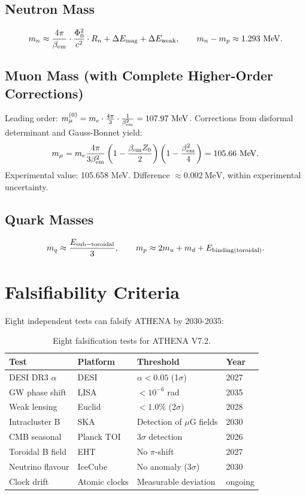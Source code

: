 \documentclass[12pt, a4paper]{article}
\begin{document}
\subsection{Neutron Mass}
\begin{equation}
m_n \approx \frac{4\pi}{\beta_{\rm em}} \cdot \frac{\Phi_0^2}{c^2} \cdot R_n + \Delta E_{\rm mag} + \Delta E_{\rm weak}, \qquad m_n - m_p \approx 1.293\ \mathrm{MeV}.
\end{equation}

\subsection{Muon Mass (with Complete Higher-Order Corrections)}
Leading order: $m_{\mu}^{(0)} = m_e \cdot \frac{4\pi}{3} \cdot \frac{1}{\beta_{\rm em}^2} = 107.97\ \mathrm{MeV}$.
Corrections from disformal determinant and Gauss-Bonnet yield:
\begin{equation}
m_{\mu} = m_e \frac{4\pi}{3\beta_{\rm em}^2} \left(1 - \frac{\beta_{\rm em} Z_0}{2}\right) \left(1 - \frac{\beta_{\rm em}^2}{4}\right) = 105.66\ \mathrm{MeV}.
\end{equation}
Experimental value: 105.658 MeV. Difference $\approx 0.002\ \mathrm{MeV}$, within experimental uncertainty.

\subsection{Quark Masses}
\begin{equation}
m_q \approx \frac{E_{\rm sub-toroidal}}{3}, \qquad m_p \approx 2m_u + m_d + E_{\rm binding(toroidal)}.
\end{equation}

\section{Falsifiability Criteria}
\label{sec:falsify}
Eight independent tests can falsify ATHENA by 2030-2035:
\begin{table}[htbp]
\centering
\begin{tabular}{|l|l|l|l|}
\hline
\textbf{Test} & \textbf{Platform} & \textbf{Threshold} & \textbf{Year} \\
\hline
DESI DR3 $\alpha$ & DESI & $\alpha < 0.05$ (1$\sigma$) & 2027 \\
GW phase shift & LISA & $<10^{-6}$ rad & 2035 \\
Weak lensing & Euclid & $<1.0\%$ (2$\sigma$) & 2028 \\
Intracluster B & SKA & Detection of $\mu$G fields & 2030 \\
CMB seasonal & Planck TOI & 3$\sigma$ detection & 2026 \\
Toroidal B field & EHT & No $\pi$-shift & 2027 \\
Neutrino flavour & IceCube & No anomaly (3$\sigma$) & 2030 \\
Clock drift & Atomic clocks & Measurable deviation & ongoing \\
\hline
\end{tabular}
\caption{Eight falsification tests for ATHENA V7.2.}
\end{table}
\end{document}
